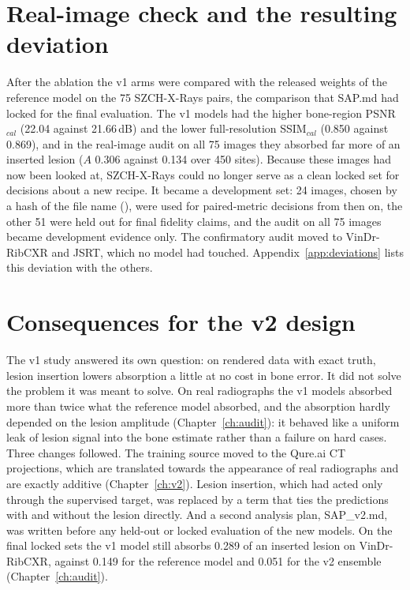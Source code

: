 \section{Real-image check and the resulting deviation}
After the ablation the v1 arms were compared with the released weights of the reference model on the 75 SZCH-X-Rays pairs, the comparison
that SAP.md had locked for the final evaluation. The v1 models had the higher bone-region PSNR$_{cal}$ (22.04 against 21.66\,dB) and the lower
full-resolution SSIM$_{cal}$ (0.850 against 0.869), and in the real-image audit on all 75 images they absorbed far more of an inserted lesion
($A$ 0.306 against 0.134 over 450 sites). Because these images had now been looked at, SZCH-X-Rays could no longer serve as a clean locked set
for decisions about a new recipe. It became a development set: 24 images, chosen by a hash of the file name (),
were used for paired-metric decisions from then on, the other 51 were held out for final fidelity claims, and the audit on all 75 images became
development evidence only. The confirmatory audit moved to VinDr-RibCXR and JSRT, which no model had touched. Appendix~\ref{app:deviations}
lists this deviation with the others.

\section{Consequences for the v2 design}
The v1 study answered its own question: on rendered data with exact truth, lesion insertion lowers absorption a little at no cost in bone
error. It did not solve the problem it was meant to solve. On real radiographs the v1 models absorbed more than twice what the reference model
absorbed, and the absorption hardly depended on the lesion amplitude (Chapter~\ref{ch:audit}): it behaved like a uniform leak of lesion
signal into the bone estimate rather than a failure on hard cases. Three changes followed. The training source moved to the Qure.ai CT
projections, which are translated towards the appearance of real radiographs and are exactly additive (Chapter~\ref{ch:v2}). Lesion insertion,
which had acted only through the supervised target, was replaced by a term that ties the predictions with and without the lesion directly.
And a second analysis plan, SAP\_v2.md, was written before any held-out or locked evaluation of the new models. On the final locked sets the v1
model still absorbs 0.289 of an inserted lesion on VinDr-RibCXR, against 0.149 for the reference model and 0.051 for the v2 ensemble
(Chapter~\ref{ch:audit}).
